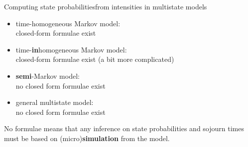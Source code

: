 \begin{frame}{Computing state probabilities\newline from intensities in multistate models}
  \begin{itemize}
  \item time-homogeneous Markov model:\\closed-form formulae exist
  \item time-\textbf{in}homogeneous Markov model:\\closed-form
    formulae exist (a bit more complicated)
  \item \textbf{semi}-Markov model:\\no closed form formulae exist
  \item general multistate model:\\no closed form formulae exist
  \end{itemize}
  \pause
  No formulae means that any inference on state probabilities and sojourn
  times must be based on (micro)\textbf{simulation} from the model.
\end{frame}

